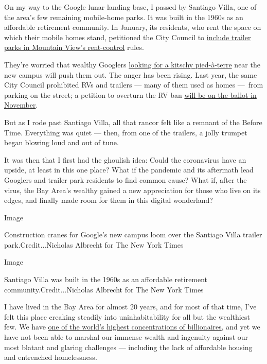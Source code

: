 On my way to the Google lunar landing base, I passed by Santiago Villa,
one of the area's few remaining mobile-home parks. It was built in the
1960s as an affordable retirement community. In January, its residents,
who rent the space on which their mobile homes stand, petitioned the
City Council to
\href{https://mv-voice.com/news/2020/01/30/city-council-agrees-in-theory-to-extend-rent-control-to-mountain-view-mobile-home-parks}{include
trailer parks in Mountain View's rent-control} rules.

They're worried that wealthy Googlers
\href{https://www.theringer.com/2016/8/18/16039104/google-santiago-villa-housing-4ac4b1ca49fe}{looking
for a kitschy pied-à-terre} near the new campus will push them out. The
anger has been rising. Last year, the same City Council prohibited RVs
and trailers --- many of them used as homes ---~from parking on the
street; a petition to overturn the RV ban
\href{https://www.mv-voice.com/news/2020/01/15/mountain-view-voters-to-decide-on-rv-parking-ban}{will
be on the ballot in November}.

But as I rode past Santiago Villa, all that rancor felt like a remnant
of the Before Time. Everything was quiet --- then, from one of the
trailers, a jolly trumpet began blowing loud and out of tune.

It was then that I first had the ghoulish idea: Could the coronavirus
have an upside, at least in this one place? What if the pandemic and its
aftermath lead Googlers and trailer park residents to find common cause?
What if, after the virus, the Bay Area's wealthy gained a new
appreciation for those who live on its edges, and finally made room for
them in this digital wonderland?

Image

Construction cranes for Google's new campus loom over the Santiago Villa
trailer park.Credit...Nicholas Albrecht for The New York Times

Image

Santiago Villa was built in the 1960s as an affordable retirement
community.Credit...Nicholas Albrecht for The New York Times

I have lived in the Bay Area for almost 20 years, and for most of that
time, I've felt this place creaking steadily into uninhabitability for
all but the wealthiest few. We have
\href{https://www.sfchronicle.com/bayarea/article/billionaires-San-Francisco-world-report-wealth-x-13832316.php}{one
of the world's highest concentrations of billionaires}, and yet we have
not been able to marshal our immense wealth and ingenuity against our
most blatant and glaring challenges --- including the lack of affordable
housing and entrenched homelessness.

